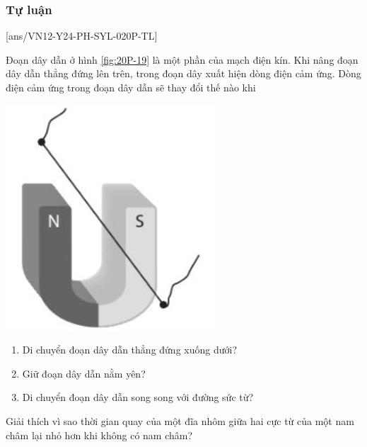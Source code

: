 \subsubsection{Tự luận}
\setcounter{ex}{0}
[ans/VN12-Y24-PH-SYL-020P-TL]
\begin{ex}
	Đoạn dây dẫn ở hình \ref{fig:20P-19} là một phần của mạch điện kín. Khi nâng đoạn dây dẫn thẳng đứng lên trên, trong đoạn dây xuất hiện dòng điện cảm ứng. Dòng điện cảm ứng trong đoạn dây dẫn sẽ thay đổi thế nào khi
	\begin{center}
		\includegraphics[width=0.2\linewidth]{figs/VN12-Y24-PH-SYL-020P-19}
		\label{fig:20P-19}
	\end{center}
	\begin{enumerate}[label=\alph*)]
		\item Di chuyển đoạn dây dẫn thẳng đứng xuống dưới?
		\item Giữ đoạn dây dẫn nằm yên?
		\item Di chuyển đoạn dây dẫn song song với đường sức từ?
	\end{enumerate}
	
\end{ex}
\begin{ex}
	Giải thích vì sao thời gian quay của một đĩa nhôm giữa hai cực từ của một nam châm lại nhỏ hơn khi không có nam châm?
\end{ex}

